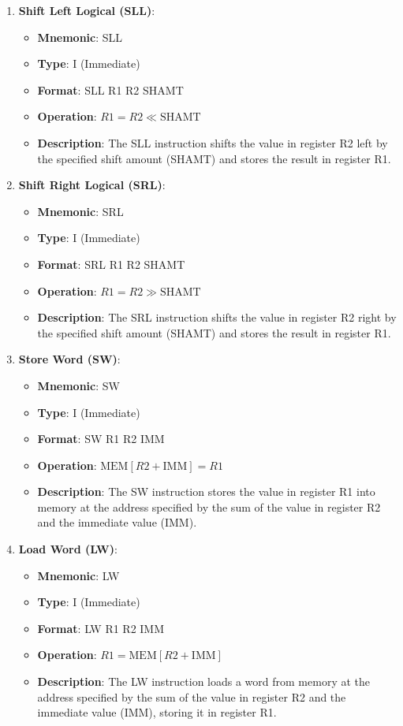 \documentclass{article}
\begin{document}
\begin{enumerate}
    \item \textbf{Shift Left Logical (SLL)}:
    \begin{itemize}
        \item \textbf{Mnemonic}: SLL
        \item \textbf{Type}: I (Immediate)
        \item \textbf{Format}: SLL R1 R2 SHAMT
        \item \textbf{Operation}: \(R1 = R2 \ll \text{SHAMT}\)
        \item \textbf{Description}: The SLL instruction shifts the value in register R2 left by the specified shift amount (SHAMT) and stores the result in register R1.
    \end{itemize}

    

\item \textbf{Shift Right Logical (SRL)}:
    \begin{itemize}
        \item \textbf{Mnemonic}: SRL
        \item \textbf{Type}: I (Immediate)
        \item \textbf{Format}: SRL R1 R2 SHAMT
        \item \textbf{Operation}: \(R1 = R2 \gg \text{SHAMT}\)
        \item \textbf{Description}: The SRL instruction shifts the value in register R2 right by the specified shift amount (SHAMT) and stores the result in register R1.
    \end{itemize}

\item \textbf{Store Word (SW)}:
    \begin{itemize}
        \item \textbf{Mnemonic}: SW
        \item \textbf{Type}: I (Immediate)
        \item \textbf{Format}: SW R1 R2 IMM
        \item \textbf{Operation}: \(\text{MEM}[R2 + \text{IMM}] = R1\)
        \item \textbf{Description}: The SW instruction stores the value in register R1 into memory at the address specified by the sum of the value in register R2 and the immediate value (IMM).
    \end{itemize}

    \item \textbf{Load Word (LW)}:
    \begin{itemize}
        \item \textbf{Mnemonic}: LW
        \item \textbf{Type}: I (Immediate)
        \item \textbf{Format}: LW R1 R2 IMM
        \item \textbf{Operation}: \(R1 = \text{MEM}[R2 + \text{IMM}]\)
        \item \textbf{Description}: The LW instruction loads a word from memory at the address specified by the sum of the value in register R2 and the immediate value (IMM), storing it in register R1.
    \end{itemize}


\end{enumerate}
\end{document}
